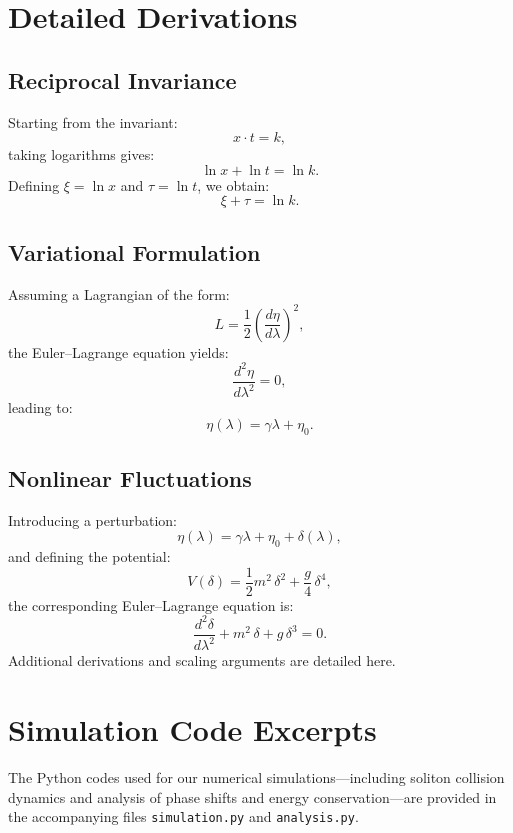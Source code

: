 \documentclass{article}
\begin{document}
\appendix
\section{Detailed Derivations}\label{app:derivations}
\subsection*{Reciprocal Invariance}
Starting from the invariant:
\[
x \cdot t = k,
\]
taking logarithms gives:
\[
\ln x + \ln t = \ln k.
\]
Defining \(\xi = \ln x\) and \(\tau = \ln t\), we obtain:
\[
\xi + \tau = \ln k.
\]

\subsection*{Variational Formulation}
Assuming a Lagrangian of the form:
\[
L = \frac{1}{2}\left(\frac{d\eta}{d\lambda}\right)^2,
\]
the Euler--Lagrange equation yields:
\[
\frac{d^2\eta}{d\lambda^2} = 0,
\]
leading to:
\[
\eta(\lambda) = \gamma \lambda + \eta_0.
\]

\subsection*{Nonlinear Fluctuations}
Introducing a perturbation:
\[
\eta(\lambda) = \gamma \lambda + \eta_0 + \delta(\lambda),
\]
and defining the potential:
\[
V(\delta) = \frac{1}{2}m^2\,\delta^2 + \frac{g}{4}\,\delta^4,
\]
the corresponding Euler--Lagrange equation is:
\[
\frac{d^2\delta}{d\lambda^2} + m^2\,\delta + g\,\delta^3 = 0.
\]
Additional derivations and scaling arguments are detailed here.

\section{Simulation Code Excerpts}
The Python codes used for our numerical simulations—including soliton collision dynamics and analysis of phase shifts and energy conservation—are provided in the accompanying files \texttt{simulation.py} and \texttt{analysis.py}.
\end{document}
